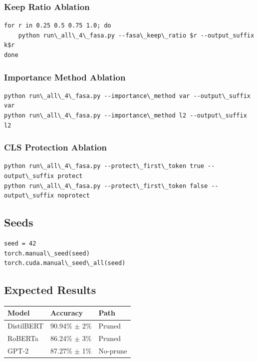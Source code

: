 \subsubsection{Keep Ratio Ablation}

\begin{lstlisting}
for r in 0.25 0.5 0.75 1.0; do
    python run\_all\_4\_fasa.py --fasa\_keep\_ratio $r --output_suffix k$r
done
\end{lstlisting}

\subsubsection{Importance Method Ablation}

\begin{lstlisting}
python run\_all\_4\_fasa.py --importance\_method var --output\_suffix var
python run\_all\_4\_fasa.py --importance\_method l2 --output\_suffix l2
\end{lstlisting}

\subsubsection{CLS Protection Ablation}

\begin{lstlisting}
python run\_all\_4\_fasa.py --protect\_first\_token true --output\_suffix protect
python run\_all\_4\_fasa.py --protect\_first\_token false --output\_suffix noprotect
\end{lstlisting}

\subsection{Seeds}

\begin{lstlisting}
seed = 42
torch.manual\_seed(seed)
torch.cuda.manual\_seed\_all(seed)
\end{lstlisting}

\subsection{Expected Results}

\begin{table}[H]
\centering
\small
\begin{tabular}{lll}
\toprule
\textbf{Model} & \textbf{Accuracy} & \textbf{Path} \\
\midrule
DistilBERT & 90.94\% $\pm$ 2\% & Pruned \\
RoBERTa & 86.24\% $\pm$ 3\% & Pruned \\
GPT-2 & 87.27\% $\pm$ 1\% & No-prune \\
\bottomrule
\end{tabular}
\end{table}

